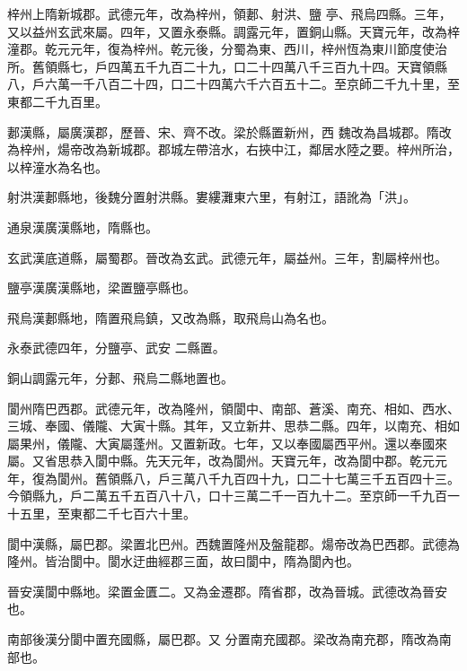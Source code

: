 \begin{pinyinscope}
 梓州上隋新城郡。武德元年，改為梓州，領郪、射洪、鹽
 亭、飛烏四縣。三年，又以益州玄武來屬。四年，又置永泰縣。調露元年，置銅山縣。天寶元年，改為梓潼郡。乾元元年，復為梓州。乾元後，分蜀為東、西川，梓州恆為東川節度使治所。舊領縣七，戶四萬五千九百二十九，口二十四萬八千三百九十四。天寶領縣八，戶六萬一千八百二十四，口二十四萬六千六百五十二。至京師二千九十里，至東都二千九百里。



 郪漢縣，屬廣漢郡，歷晉、宋、齊不改。梁於縣置新州，西
 魏改為昌城郡。隋改為梓州，煬帝改為新城郡。郡城左帶涪水，右挾中江，鄰居水陸之要。梓州所治，以梓潼水為名也。



 射洪漢郪縣地，後魏分置射洪縣。婁縷灘東六里，有射江，語訛為「洪」。



 通泉漢廣漢縣地，隋縣也。



 玄武漢底道縣，屬蜀郡。晉改為玄武。武德元年，屬益州。三年，割屬梓州也。



 鹽亭漢廣漢縣地，梁置鹽亭縣也。



 飛烏漢郪縣地，隋置飛烏鎮，又改為縣，取飛烏山為名也。



 永泰武德四年，分鹽亭、武安
 二縣置。



 銅山調露元年，分郪、飛烏二縣地置也。



 閬州隋巴西郡。武德元年，改為隆州，領閬中、南部、蒼溪、南充、相如、西水、三城、奉國、儀隴、大寅十縣。其年，又立新井、思恭二縣。四年，以南充、相如屬果州，儀隴、大寅屬蓬州。又置新政。七年，又以奉國屬西平州。還以奉國來屬。又省思恭入閬中縣。先天元年，改為閬州。天寶元年，改為閬中郡。乾元元年，復為閬州。舊領縣八，戶三萬八千九百四十九，口二十七萬三千五百四十三。
 今領縣九，戶二萬五千五百八十八，口十三萬二千一百九十二。至京師一千九百一十五里，至東都二千七百六十里。



 閬中漢縣，屬巴郡。梁置北巴州。西魏置隆州及盤龍郡。煬帝改為巴西郡。武德為隆州。皆治閬中。閬水迂曲經郡三面，故曰閬中，隋為閬內也。



 晉安漢閬中縣地。梁置金匱二。又為金遷郡。隋省郡，改為晉城。武德改為晉安也。



 南部後漢分閬中置充國縣，屬巴郡。又
 分置南充國郡。梁改為南充郡，隋改為南部也。




\end{pinyinscope}
